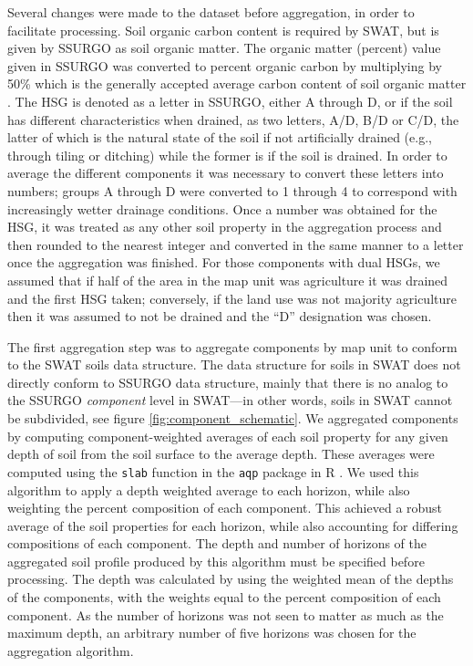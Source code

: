 Several changes were made to the dataset before aggregation, in order to
facilitate processing. Soil organic carbon content is required by SWAT, but is
given by SSURGO as soil organic matter. The organic matter (percent) value given in SSURGO
was converted to percent organic carbon by multiplying by 50\% which is the generally accepted average carbon content of soil organic matter \citep{brady_elements_2004}. The HSG is
denoted as a letter in SSURGO, either A through D, or if the soil has different
characteristics when drained, as two letters, A/D, B/D or C/D, the latter of
which is the natural state of the soil if not artificially drained (e.g.,
through tiling or ditching) while the former is if the soil is drained. In order
to average the different components it was necessary to convert these letters
into numbers; groups A through D were converted to 1 through 4 to correspond
with increasingly wetter drainage conditions. Once a number was obtained for the
HSG, it was treated as any other soil property in the aggregation process and
then rounded to the nearest integer and converted in the same manner to a letter
once the aggregation was finished. For those components with dual HSGs, we
assumed that if half of the area in the map unit was agriculture it was drained
and the first HSG taken; conversely, if the land use was not majority agriculture
then it was assumed to not be drained and the ``D'' designation was chosen.

The first aggregation step was to aggregate components by map unit to conform to
the SWAT soils data structure. The data structure for soils in SWAT does not
directly conform to SSURGO data structure, mainly that there is no analog to the
SSURGO \textit{component} level in SWAT---in other words, soils in SWAT cannot
be subdivided, see figure \ref{fig:component_schematic}. We aggregated components by computing
component-weighted averages of each soil property for any given depth of soil from the soil surface to the average depth\cite{gatzke_aggregation_2011, beaudette_algorithms_2013}.
These averages were computed using the \texttt{slab} function in the \texttt{aqp} package in R \cite{beaudette_algorithms_2013}. We
used this algorithm to apply a depth weighted average to each horizon, while
also weighting the percent composition of each component. This achieved a robust
average of the soil properties for each horizon, while also accounting for
differing compositions of each component. The depth and number of horizons of
the aggregated soil profile produced by this algorithm must be specified before
processing. The depth was calculated by using the weighted mean of the depths of
the components, with the weights equal to the percent composition of each
component. As the number of horizons was not seen to matter as much as the
maximum depth, an arbitrary number of five horizons was chosen for the
aggregation algorithm.

